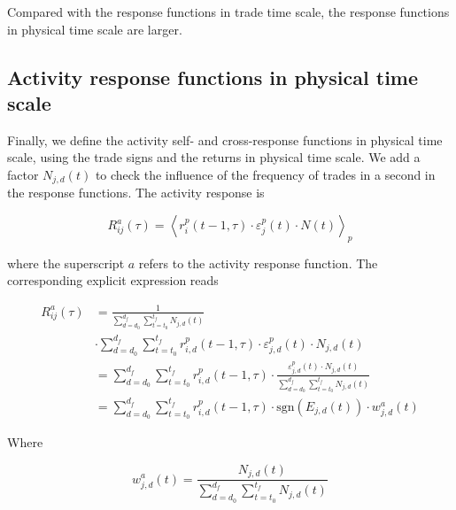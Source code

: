 Compared with the response functions in trade time scale, the response functions
in physical time scale are larger.

\subsection{Activity response functions in physical time scale}
\label{subsec:activity_response_function}

Finally, we define the activity self- and cross-response functions in physical
time scale, using the trade signs and the returns in physical time scale.
We add a factor $N_{j,d} \left(t \right)$ to check the influence of the
frequency of trades in a second in the response functions. The activity
response is

\begin{equation}\label{eq:activity_response_functions_general}
    R^{a}_{ij}\left(\tau\right)=\left\langle r^{p}_{i}\left(t-1, \tau\right)
    \cdot\varepsilon_{j}^{p} \left(t\right) \cdot N \left(t \right)
    \right\rangle _{p}
\end{equation}

where the superscript $a$ refers to the activity response function. The
corresponding explicit expression reads

\begin{align}
    R_{ij}^{a}\left(\tau\right)&=\frac{1}{\sum_{d=d_{0}}^{d_{f}}
    \sum_{t=t_{0}}^{t_{f}}N_{j,d} \left(t\right)} \nonumber \\
    &\cdot\sum_{d=d_{0}}^{d_{f}}\sum_{t=t_{0}}^{t_{f}}r^{p}_{i,d}
    \left(t-1,\tau\right) \cdot\varepsilon_{j,d}^{p}\left(t\right)\cdot N_{j,d}
    \left(t\right)\\
    &=\sum_{d=d_{0}}^{d_{f}} \sum_{t=t_{0}}^{t_{f}}r^{p}_{i,d}
    \left(t-1,\tau\right) \cdot\frac{\varepsilon_{j,d}^{p}\left(t \right)
    \cdot N_{j,d}\left(t\right)} {\sum_{d=d_{0}}^{d_{f}}\sum_{t=t_{0}}^{t_{f}}
    N_{j,d}\left(t \right)} \nonumber \\
    &=\sum_{d=d_{0}}^{d_{f}} \sum_{t=t_{0}}^{t_{f}}r^{p}_{i,d}
    \left(t-1,\tau\right) \cdot\text{sgn}\left(E_{j,d}\left(t\right)\right)
    \cdot w_{j,d}^{a}\left(t\right)
\end{align}

Where

\begin{equation}
    w_{j,d}^{a}\left(t\right) = \frac{N_{j,d}\left(t \right)}
    {\sum_{d=d_{0}}^{d_{f}}\sum_{t=t_{0}}^{t_{f}}N_{j,d}\left(t\right)}
\end{equation}

